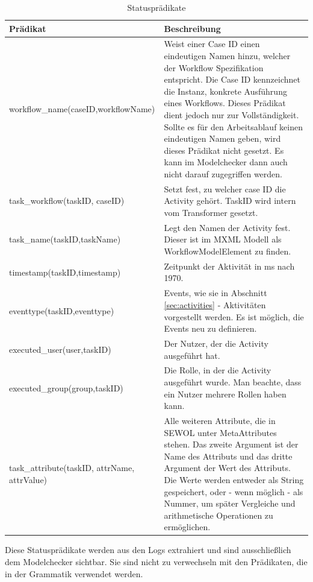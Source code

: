 \begin{table}[h!]
\begin{tabular} {|p{6cm}|p{10cm}|}
\hline
\textbf{Prädikat} & \textbf{Beschreibung}\\
\hline
\small workflow{\_}name(caseID,workflowName)& Weist einer Case ID einen eindeutigen Namen hinzu, welcher der Workflow Spezifikation entspricht. Die Case ID kennzeichnet die Instanz, konkrete Ausführung eines Workflows. Dieses Prädikat dient jedoch nur zur Vollständigkeit. Sollte es für den Arbeitsablauf keinen eindeutigen Namen geben, wird dieses Prädikat nicht gesetzt. Es kann im Modelchecker dann auch nicht darauf zugegriffen werden.\\
\hline
\small task{\_}workflow(taskID, caseID)& Setzt fest, zu welcher case ID die Activity gehört. TaskID wird intern vom Transformer gesetzt.\\
\hline
\small task{\_}name(taskID,taskName)&Legt den Namen der Activity fest. Dieser ist im MXML Modell als WorkflowModelElement zu finden. \\
\hline
\small timestamp(taskID,timestamp)&Zeitpunkt der Aktivität in ms nach 1970. \\
\hline
\small eventtype(taskID,eventtype)& Events, wie sie in Abschnitt \ref{sec:activities} - Aktivitäten vorgestellt werden. Es ist möglich, die Events neu zu definieren.\\
\hline
\small executed{\_}user(user,taskID)&Der Nutzer, der die Activity ausgeführt hat. \\
\hline
\small executed{\_}group(group,taskID)&Die Rolle, in der die Activity ausgeführt wurde. Man beachte, dass ein Nutzer mehrere Rollen haben kann.\\
\hline
\small task{\_}attribute(taskID, attrName, attrValue)& Alle weiteren Attribute, die in SEWOL unter MetaAttributes stehen. Das zweite Argument ist der Name des Attributs und das dritte Argument der Wert des Attributs. Die Werte werden entweder als String gespeichert, oder - wenn möglich - als Nummer, um später Vergleiche und arithmetische Operationen zu ermöglichen. \\

\hline
\end{tabular}
Diese Statusprädikate werden aus den Logs extrahiert und sind ausschließlich dem Modelchecker sichtbar. Sie sind nicht zu verwechseln mit den Prädikaten, die in der Grammatik verwendet werden. 
\caption{Statusprädikate}
\label{tab:statuspr}
\end{table}


